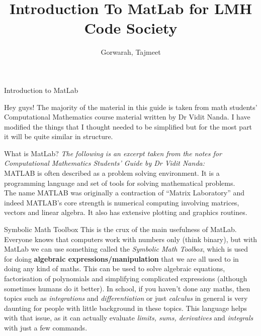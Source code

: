\documentclass[11pt, oneside]{report}   	%
\title{Introduction To MatLab for LMH Code Society}
\author{Gorwarah, Tajmeet}
\begin{document}
\maketitle
\begin{chapter}{Introduction to MatLab}

Hey guys! The majority of the material in this guide is taken from math students' Computational Mathematics course material written by Dr Vidit Nanda. I have modified the things that I thought needed to be simplified but for the most part it will be quite similar in structure.

\begin{section}{What is MatLab?}
\textit{The following is an excerpt taken from the notes for Computational Mathematics Students' Guide by Dr Vidit Nanda:}
\\

MATLAB is often described as a problem solving environment. It is a programming language and set of tools for solving mathematical problems.\\

The name MATLAB was originally a contraction of “Matrix Laboratory” and indeed MATLAB’s core strength is numerical computing involving matrices, vectors and linear algebra. It also has extensive plotting and graphics routines.

\begin{subsection}{Symbolic Math Toolbox}
This is the crux of the main usefulness of MatLab. Everyone knows that computers work with numbers only (think binary), but with MatLab we can use something called the
\textit{Symbolic Math Toolbox}, which is used for doing \textbf{algebraic expressions/manipulation} that we are all used to in doing any kind of maths. This can be used to
solve algebraic equations, factorisation of polynomials and simplifying complicated expressions (although sometimes humans do it better). In school, if you haven't done any
maths, then topics such as \textit{integrations} and \textit{differentiation} or just \textit{calculus} in general is very daunting for people with little background in these topics. 
This language helps with that issue, as it can actually evaluate \textit{limits, sums, derivatives} and \textit{integrals} with just a few commands.


\end{subsection}
\end{section}
\end{chapter}
\end{document}
